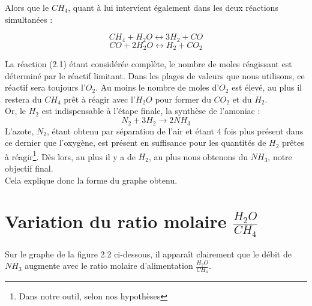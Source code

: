 \documentclass[12pt]{report}
\begin{document}
 
 Alors que le $CH_4$, quant à lui intervient également dans les deux réactions simultanées :
 
 \begin{equation}
 CH_4 + H_2O \leftrightarrow 3H_2 + CO
 \end{equation}
 \begin{equation}
 CO + 2H_2O \leftrightarrow H_2 + CO_2
 \end{equation}

La réaction (2.1) étant considérée complète, le nombre de moles réagissant est déterminé par le réactif limitant. Dans les plages de valeurs que nous utilisons, ce réactif sera toujours l'$O_2$. Au moins le nombre de moles d'$O_2$ est élevé, au plus il restera du $CH_4$ prêt à réagir avec l'$H_2O$ pour former du $CO_2$ et du $H_2$.\\

Or, le $H_2$ est indispensable à l'étape finale, la synthèse de l'amoniac : 
\begin{equation}
N_2 + 3H_2 \rightarrow 2NH_3
\end{equation}
L'azote, $N_2$, étant obtenu par séparation de l'air et étant 4 fois plus présent dans ce dernier que l'oxygène, est présent en suffisance pour les quantités de $H_2$ prêtes à réagir\footnote{Dans notre outil, selon nos hypothèses}. Dès lors, au plus il y a de $H_2$, au plus nous obtenons du $NH_3$, notre objectif final.\\

Cela explique donc la forme du graphe obtenu.\\

\section{Variation du ratio molaire $\frac{H_2O}{CH_4}$}

Sur le graphe de la figure 2.2 ci-dessous, il apparaît clairement que le débit de $NH_3$ augmente avec le ratio molaire d'alimentation $\frac{H_2O}{CH_4}$.\\
\end{document}
